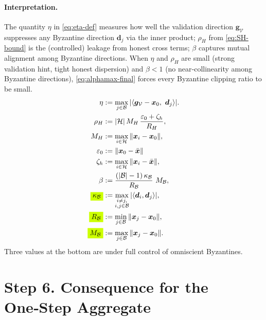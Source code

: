 \documentclass{article}
\theoremstyle{plain}
\theoremstyle{definition}
\theoremstyle{remark}
\begin{document}
\bigskip
\paragraph{Interpretation.}
The quantity $\eta$ in \eqref{eq:eta-def} measures how well the validation direction $\bm{g}_{\mathcal{V}}$ suppresses any Byzantine direction $\bm{d}_j$ via the inner product; 
$\rho_H$ from \eqref{eq:SH-bound} is the (controlled) leakage from honest cross terms; 
$\beta$ captures mutual alignment among Byzantine directions.
When $\eta$ and $\rho_H$ are small (strong validation hint, tight honest dispersion) and $\beta<1$ (no near‑collinearity among Byzantine directions), \eqref{eq:alphamax-final} forces every Byzantine clipping ratio to be small.
\begin{align*}
%
\eta
    &:= \max_{j\in \mathcal{B}} |\langle \bm{g}_{\mathcal{V}}-\bm{x}_0,\ \bm{d}_j\rangle|.\\
%
\rho_H
    &:= |\mathcal{H}|\, M_H \,\frac{\varepsilon_0+\zeta_h}{R_H},\\
%
M_H
    &:= \max_{i\in \mathcal{H}}\|\bm{x}_i-\bm{x}_0\|,\\
%
\varepsilon_0
    &:= \|\bm{x}_0-\bar{\bm{x}}\|\\
%
\zeta_h
    &:=
    \max_{i \in \mathcal{H}}
        \|\bm{x}_i-\bar{\bm{x}}\|,\\
%
\beta
    &:= \frac{(|\mathcal{B}|-1)\,\kappa_{\mathcal{B}}}{R_{\mathcal{B}}}\  M_{\mathcal{B}},\\
%
  \colorbox{fluor}{%
    $\displaystyle
    \kappa_{\mathcal{B}}
    $%
  }
    &:= \max_{
        \substack{
            i \neq j,\\
            i,j \in \mathcal{B}
        }
    } |\langle \bm{d}_i,\bm{d}_j\rangle|,\\
%
  \colorbox{fluor}{%
    $\displaystyle
    R_{\mathcal{B}}	
    $%
  }
    &:=\min_{j\in \mathcal{B}}\|\bm{x}_j-\bm{x}_0\|,\\
%
  \colorbox{fluor}{%
    $\displaystyle
    M_{\mathcal{B}}	
    $%
  }
    &:= \max_{j\in \mathcal{B}}\|\bm{x}_j-\bm{x}_0\|.
%
\end{align*}
Three values at the bottom are under full control of omniscient Byzantines.


\bigskip
\section*{Step 6. Consequence for the One‑Step Aggregate}
\end{document}
